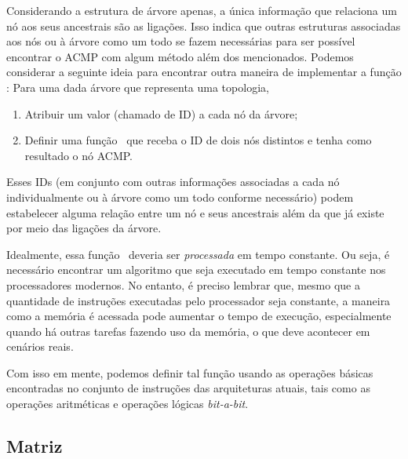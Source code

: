 



Considerando a estrutura de árvore apenas, a única informação que relaciona um nó aos seus ancestrais são as ligações.
Isso indica que outras estruturas associadas aos nós ou à árvore como um todo se fazem necessárias
para ser possível encontrar o ACMP com algum método além dos mencionados.
Podemos considerar a seguinte ideia para encontrar outra maneira de implementar a função \fACMP:
Para uma dada árvore que representa uma topologia,
\begin{enumerate}
	\item Atribuir um valor (chamado de ID) a cada nó da árvore;
	\item Definir uma função \ACMPIDs\ que receba o ID de dois nós distintos e tenha como resultado o nó ACMP.
\end{enumerate}
Esses IDs (em conjunto com outras informações associadas a cada nó individualmente ou à árvore como um todo conforme necessário)
podem estabelecer alguma relação entre um nó e seus ancestrais além da que já existe por meio das ligações da árvore.

Idealmente, essa função \ACMPIDs\ deveria ser \textit{processada} em tempo constante.
Ou seja, é necessário encontrar um algoritmo que seja executado em tempo constante nos processadores modernos.
No entanto, é preciso lembrar que, mesmo que a quantidade de instruções executadas pelo processador seja constante,
a maneira como a memória é acessada pode aumentar o tempo de execução, especialmente quando há outras tarefas fazendo uso da memória, o que deve acontecer em cenários reais.

Com isso em mente, podemos definir tal função usando as operações básicas encontradas no conjunto de instruções das arquiteturas atuais,
tais como as operações aritméticas e operações lógicas \textit{bit-a-bit}.

\subsection{Matriz}

